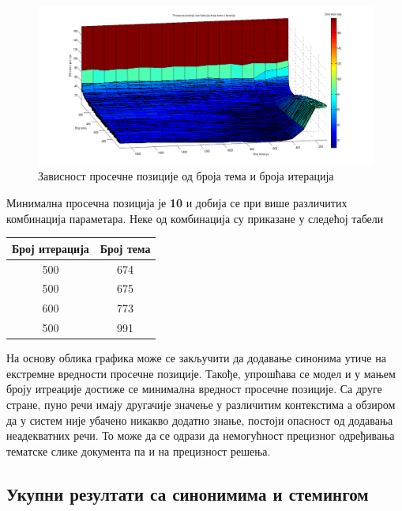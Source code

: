 		\begin{figure}[H]
    \centering
   \includegraphics[scale=0.3]{./Slike/NoStemmSyn.png} 
	\caption{Зависност просечне позиције од броја тема и броја итерација}
	\label{fig:slika1}
\end{figure}

Минимална просечна позиција је \textbf{10} и добија се при више различитих комбинација параметара. Неке од комбинација су приказане у следећој табели

\begin{center}
\begin{tabular}{|c|c|}
\hline
Број итерација & Број тема \\
\hline\hline
500 & 674 \\
500 & 675 \\
600 & 773 \\
500 & 991 \\
\hline
\end{tabular}
\end{center}

На основу облика графика може се закључити да додавање синонима утиче на екстремне вредности просечне позиције. Такође, упрошћава се модел и у мањем броју итреације достиже се минимална вредност просечне позиције. 
Са друге стране, пуно речи имају другачије значење у различитим контекстима а обзиром да у систем није убачено никакво додатно знање, постоји опасност од додавања неадекватних речи. То може да се одрази да немогућност прецизног одређивања тематске слике документа па и на прецизност решења.






\subsection{Укупни резултати са синонимима и стемингом}

